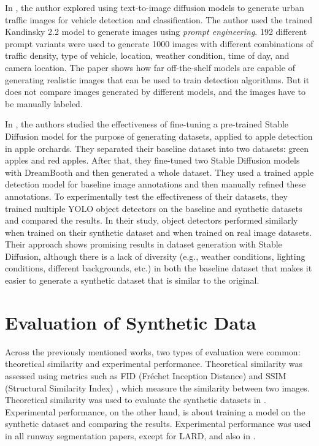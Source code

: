 In \cite{reutov_generating_2023}, the author explored using text-to-image
diffusion models to generate urban traffic images for vehicle detection and
classification. The author used the trained Kandinsky 2.2 model to generate
images using \emph{prompt engineering}. 192 different prompt variants were used to generate 1000 images with different combinations of traffic density, type of vehicle, location, weather condition, time of day, and camera location. The paper shows how far off-the-shelf models are capable of generating realistic images that can be used to train detection algorithms. But it does not compare images generated by different models, and the images have to be manually labeled. 

In \cite{voetman_big_2023}, the authors studied the effectiveness of fine-tuning
a pre-trained Stable Diffusion model for the purpose of generating datasets,
applied to apple detection in apple orchards. They separated their baseline
dataset into two datasets: green apples and red apples. After that, they
fine-tuned two Stable Diffusion models with DreamBooth and then generated a
whole dataset. They used a trained apple detection model for baseline image
annotations and then manually refined these annotations. To experimentally test
the effectiveness of their datasets, they trained multiple YOLO \cite{redmon_you_2016} object detectors on the baseline and synthetic datasets and compared the results. In their study, object detectors performed similarly when trained on their synthetic dataset and when trained on real image datasets. Their approach shows promising results in dataset generation with Stable Diffusion, although there is a lack of diversity (e.g., weather conditions, lighting conditions, different backgrounds, etc.) in both the baseline dataset that makes it easier to generate a synthetic dataset that is similar to the original.

\section{Evaluation of Synthetic Data}

Across the previously mentioned works, two types of evaluation were common: theoretical similarity and experimental performance. Theoretical similarity was assessed using metrics such as FID (Fréchet Inception Distance) \cite{heusel_gans_2017} and SSIM (Structural Similarity Index) \cite{wang_image_2004}, which measure the similarity between two images. Theoretical similarity was used to evaluate the synthetic datasets in \cite{saragih_using_2024}. Experimental performance, on the other hand, is about training a model on the synthetic dataset and comparing the results. Experimental performance was used in all runway segmentation papers, except for LARD, and also in \cite{reutov_generating_2023, voetman_big_2023}.

